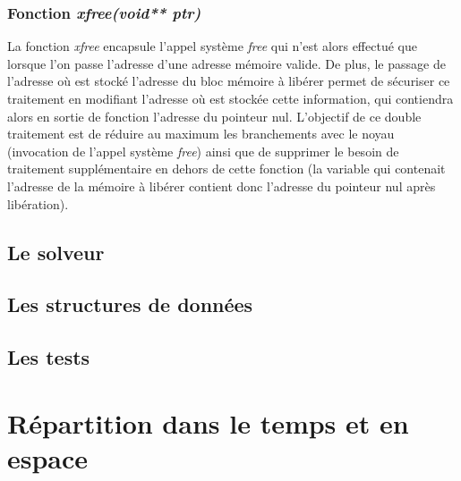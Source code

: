 \documentclass{report}
\begin{document}
\subsubsection*{Fonction \textit{xfree(void** ptr)}}
La fonction \textit{xfree} encapsule l'appel système \textit{free} qui n'est alors effectué que lorsque l'on passe l'adresse d'une adresse mémoire valide.
De plus, le passage de l'adresse où est stocké l'adresse du bloc mémoire à libérer permet de sécuriser ce traitement en modifiant l'adresse où est stockée cette information, qui contiendra alors en sortie de fonction l'adresse du pointeur nul.
L'objectif de ce double traitement est de réduire au maximum les branchements avec le noyau (invocation de l'appel système \textit{free}) ainsi que de supprimer le besoin de traitement supplémentaire en dehors de cette fonction (la variable qui contenait l'adresse de la mémoire à libérer contient donc l'adresse du pointeur nul après libération).

\subsection{Le solveur}

\subsection{Les structures de données}

\subsection{Les tests}

\section{Répartition dans le temps et en espace}
\end{document}
